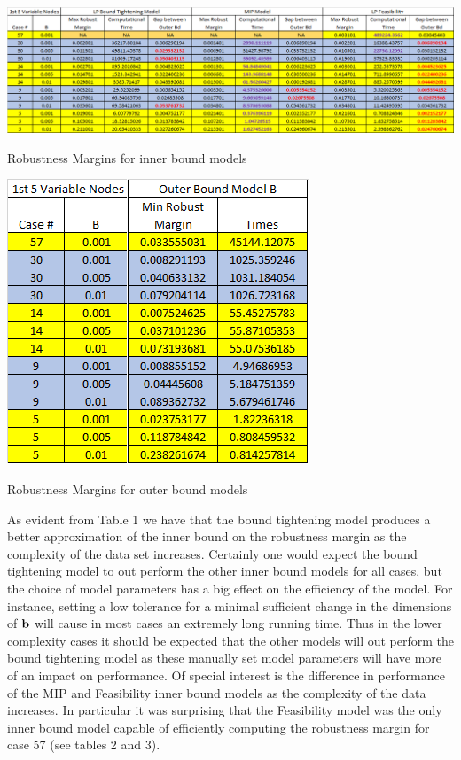 \documentclass[11pt]{article}
\theoremstyle{plain}
\theoremstyle{definition}
\theoremstyle{remark}
\begin{document}
\begin{table}[h]
\begin{center}
\includegraphics[scale=0.6]{Figures/InnerBoundTable}
\caption{Robustness Margins for inner bound models } 
\vspace{0.2in}
\includegraphics[scale=0.5]{Figures/OuterBoundTable}
\caption{Robustness Margins for outer bound models}
\end{center}
\label{tbl:Table1}
\end{table} 

As evident from Table 1 we have that the bound tightening model produces a better approximation of the inner bound on the robustness margin as the complexity of the data set increases. 
Certainly one would expect the bound tightening model to out perform the other inner bound models for all cases, but the choice of model parameters has a big effect on the efficiency of the model. 
For instance, setting a low tolerance for a minimal sufficient change in the dimensions of $\bold b$ will cause in most cases an extremely long running time. 
Thus in the lower complexity cases it should be expected that the other models will out perform the bound tightening model as these manually set model parameters will have more of an impact on performance. 
Of special interest is the difference in performance of the MIP and Feasibility inner bound models as the complexity of the data increases. 
In particular it was surprising that the Feasibility model was the only inner bound model capable of efficiently computing the robustness margin for case 57 (see tables 2 and 3). 
\end{document}
